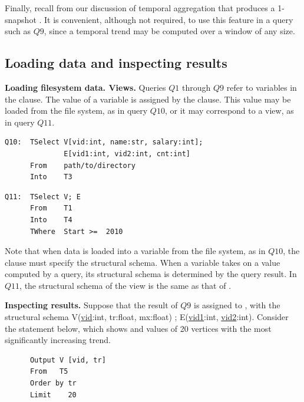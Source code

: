 Finally, recall from our discussion of temporal aggregation that
 produces a 1-snapshot \tg.  It is convenient,
although not required, to use this feature in a query such as $Q9$,
since a temporal trend may be computed over a window of any size.

\subsection{Loading data and inspecting results}
\label{sec:example:loadshow}

{\bf Loading filesystem data.  Views.}  Queries $Q1$ through $Q9$
refer to \tg variables in the  clause.  The value of a \tg
variable is assigned by the  clause.  This value may be
loaded from the file system, as in query $Q10$, or it may correspond to
a view, as in query $Q11$.

\begin{small}
\begin{verbatim}
Q10:  TSelect V[vid:int, name:str, salary:int]; 
              E[vid1:int, vid2:int, cnt:int]
      From    path/to/directory
      Into    T3
\end{verbatim}
\end{small}

\begin{small}
\begin{verbatim}
Q11:  TSelect V; E
      From    T1
      Into    T4
      TWhere  Start >=  2010 
\end{verbatim}
\end{small}

Note that when data is loaded into a \tg variable from the file
system, as in $Q10$, the  clause must specify the
structural schema.  When a \tg variable takes on a value computed by a
query, its structural schema is determined by the query result.  In
$Q11$, the structural schema of the view  is the same as
that of .

{\bf Inspecting results.}  Suppose that the result of $Q9$ is assigned
to , with the structural schema V(\underline{vid}:int,
tr:float, mx:float) ; E(\underline{vid1}:int, \underline{vid2}:int).
Consider the statement below, which shows  and 
values of 20 vertices with the most significantly increasing
 trend.

\begin{small}
\begin{verbatim}
      Output V [vid, tr]  
      From   T5 
      Order by tr
      Limit    20
\end{verbatim}
\end{small}

